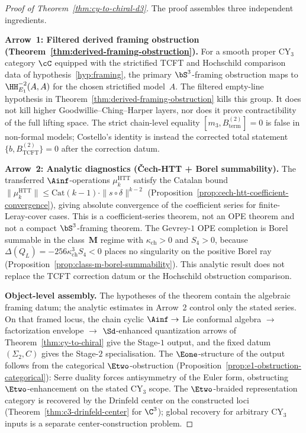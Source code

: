 \begin{proof}[Proof of Theorem~\textup{\ref{thm:cy-to-chiral-d3}}]
The proof assembles three independent ingredients.

\smallskip\noindent\textbf{Arrow~1: Filtered derived framing obstruction (Theorem~\textup{\ref{thm:derived-framing-obstruction}}).}
For a smooth proper CY$_3$ category $\cC$ equipped with the strictified
TCFT and Hochschild comparison data of hypothesis~\ref{hyp:framing}, the
primary $\bS^3$-framing obstruction maps to
$\HH^{-2}_{E_1}(A,A)$ for the chosen strictified model~$A$. The filtered
empty-line hypothesis in Theorem~\ref{thm:derived-framing-obstruction}
kills this group. It does not kill higher Goodwillie--Ching--Harper
layers, nor does it prove contractibility of the full lifting space. The
strict chain-level equality $[m_3,B^{(2)}_{\mathrm{term}}]=0$ is false
in non-formal models; Costello's identity is instead the corrected
total statement $\{b,B^{(2)}_{\mathrm{TCFT}}\}=0$ after the correction
datum.

\smallskip\noindent\textbf{Arrow~2: Analytic diagnostics (\v{C}ech-HTT + Borel summability).}
The transferred $\Ainf$-operations $\mu_k^{\mathrm{HTT}}$ satisfy the Catalan bound $\|\mu_k^{\mathrm{HTT}}\| \leq \mathrm{Cat}(k-1) \cdot \|s \circ \delta\|^{k-2}$ (Proposition~\textup{\ref{prop:cech-htt-coefficient-convergence}}), giving absolute convergence of the coefficient series for finite-Leray-cover cases. This is a coefficient-series theorem, not an OPE theorem and not a compact $\bS^3$-framing theorem. The Gevrey-$1$ OPE completion is Borel summable in the class~$\mathbf{M}$ regime with $\kappa_{\mathrm{ch}} > 0$ and $S_4 > 0$, because $\Delta(Q_L) = -256\kappa_{\mathrm{ch}}^3 S_4 < 0$ places no singularity on the positive Borel ray (Proposition~\textup{\ref{prop:class-m-borel-summability}}). This analytic result does not replace the TCFT correction datum or the Hochschild obstruction comparison.

\smallskip\noindent\textbf{Object-level assembly.}
The hypotheses of the theorem contain the algebraic framing datum; the
analytic estimates in Arrow~2 control only the stated series. On that
framed locus, the chain cyclic $\Ainf \to$ Lie conformal algebra $\to$
factorization envelope $\to$ $\Sd$-enhanced quantization arrows of
Theorem~\textup{\ref{thm:cy-to-chiral}} give the Stage-$1$ output, and
the fixed datum $(\Sigma_2,C)$ gives the Stage-$2$ specialisation. The
$\Eone$-structure of the output follows from the categorical
$\Etwo$-obstruction (Proposition~\textup{\ref{prop:e1-obstruction-categorical}}):
Serre duality forces antisymmetry of the Euler form, obstructing
$\Etwo$-enhancement on the stated CY$_3$ scope. The $\Etwo$-braided
representation category is recovered by the Drinfeld center on the
constructed loci (Theorem~\textup{\ref{thm:c3-drinfeld-center}} for
$\C^3$); global recovery for arbitrary CY$_3$ inputs is a separate
center-construction problem.


\end{proof}

